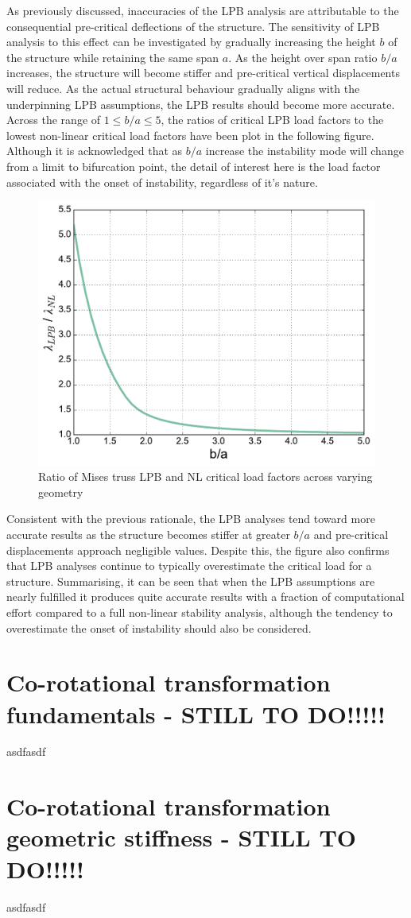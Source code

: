 As previously discussed, inaccuracies of the LPB analysis are attributable to the consequential pre-critical deflections of the structure. The sensitivity of LPB analysis to this effect can be investigated by gradually increasing the height $b$ of the structure while retaining the same span $a$. As the height over span ratio $b/a$ increases, the structure will become stiffer and pre-critical vertical displacements will reduce. As the actual structural behaviour gradually aligns with the underpinning LPB assumptions, the LPB results should become more accurate. Across the range of $1 \le b/a \le 5$, the ratios of critical LPB load factors to the lowest non-linear critical load factors have been plot in the following figure. Although it is acknowledged that as $b/a$ increase the instability mode will change from a limit to bifurcation point, the detail of interest here is the load factor associated with the onset of instability, regardless of it's nature.

\begin{figure}[H]
	\centering
	\def\svgwidth{\columnwidth}
	\includegraphics[width=12cm]{images/stability_analysis_mises_truss_lpb.pdf}
	\caption{Ratio of Mises truss LPB and NL critical load factors across varying geometry}
	\label{stab3}
\end{figure}

Consistent with the previous rationale, the LPB analyses tend toward more accurate results as the structure becomes stiffer at greater $b/a$ and pre-critical displacements approach negligible values. Despite this, the figure also confirms that LPB analyses continue to typically overestimate the critical load for a structure. Summarising, it can be seen that when the LPB assumptions are nearly fulfilled it produces quite accurate results with a fraction of computational effort compared to a full non-linear stability analysis, although the tendency to overestimate the onset of instability should also be considered. 

\section{Co-rotational transformation fundamentals - STILL TO DO!!!!!}
asdfasdf

\section{Co-rotational transformation geometric stiffness - STILL TO DO!!!!!}
asdfasdf
